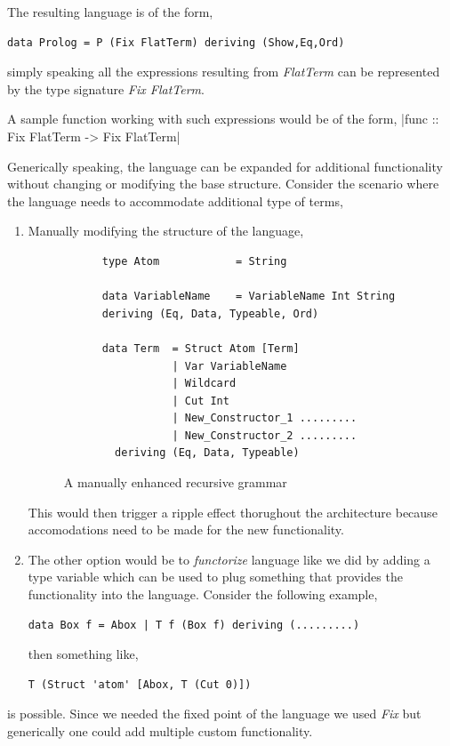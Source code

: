 \documentclass[thesis-solanki.tex]{subfiles}
\begin{document}
The resulting language is of the form,
\begin{verbatim}
data Prolog = P (Fix FlatTerm) deriving (Show,Eq,Ord)
\end{verbatim}

simply speaking all the expressions resulting from \textit{FlatTerm} can be represented  by the type signature \textit{Fix FlatTerm}. 

A sample function working with such expressions would be of the form,
|func :: Fix FlatTerm -> Fix FlatTerm|


Generically speaking, the language can be expanded for additional functionality without changing or modifying the base structure. Consider
the scenario where the language needs to accommodate additional type of terms,

\begin{enumerate}
\item Manually modifying the structure of the language, 
  \begin{figure}
    \begin{verbatim}
      type Atom            = String

      data VariableName    = VariableName Int String
      deriving (Eq, Data, Typeable, Ord)

      data Term  = Struct Atom [Term]
                 | Var VariableName
                 | Wildcard  
                 | Cut Int
                 | New_Constructor_1 .........
                 | New_Constructor_2 .........
        deriving (Eq, Data, Typeable)
    \end{verbatim}
    \caption{A manually enhanced recursive grammar}
    \label{tab:man-enhan-gram}
  \end{figure}

This would then trigger a ripple effect thorughout the architecture because accomodations need to be made for the new functionality.

\item The other option would be to \textit{functorize} language like we did by adding a type variable which can be used to plug something that provides the functionality into the language.
Consider the following example,

\begin{verbatim}
data Box f = Abox | T f (Box f) deriving (.........)
\end{verbatim}

then something like,
\begin{verbatim}
T (Struct 'atom' [Abox, T (Cut 0)])
\end{verbatim}
\end{enumerate}
is possible. Since we needed the fixed point of the language we used \textit{Fix} but generically one could add multiple custom 
functionality.
 
\end{document}
